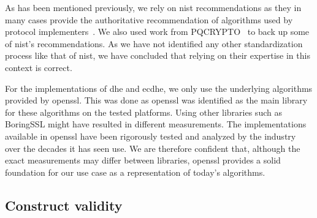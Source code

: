 As has been mentioned previously, we rely on \gls{nist} recommendations as they in many cases provide the authoritative recommendation of algorithms used by protocol implementers~\cite{nist:round-three-submissions, nist2019}. We also used work from PQCRYPTO~\cite{eu2015} to back up some of \gls{nist}'s recommendations. As we have not identified any other standardization process like that of \gls{nist}, we have concluded that relying on their expertise in this context is correct.

For the implementations of \gls{dhe} and \gls{ecdhe}, we only use the underlying algorithms provided by \gls{openssl}. This was done as \gls{openssl} was identified as the main library for these algorithms on the tested platforms. Using other libraries such as BoringSSL might have resulted in different measurements. The implementations available in \gls{openssl} have been rigorously tested and analyzed by the industry over the decades it has seen use. We are therefore confident that, although the exact measurements may differ between libraries, \gls{openssl} provides a solid foundation for our use case as a representation of today's algorithms.


\subsection{Construct validity}



